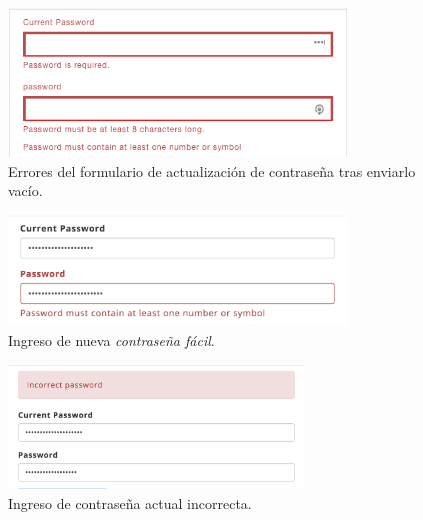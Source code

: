 \begin{figure}[H]
	\centering
	\includegraphics[width=0.8\textwidth]{figuras/formularios/update_password/empty_form_send.png}

	\caption{Errores del formulario de actualización de contraseña tras enviarlo vacío.}
	\label{figure:apendice:profile:form:update_password:empty_form_send}
\end{figure}

\begin{figure}[H]
	\centering
	\includegraphics[width=0.8\textwidth]{figuras/formularios/update_password/weak_password.png}

	\caption{Ingreso de nueva \textit{contraseña fácil}.}
	\label{figure:apendice:profile:form:update_password:week_password}
\end{figure}


\begin{figure}[H]
	\centering
	\includegraphics[width=0.7\textwidth]{figuras/formularios/update_password/incorrect_password.png}

	\caption{Ingreso de contraseña actual incorrecta.}
	\label{figure:apendice:profile:form:update_password:incorrect_password}
\end{figure}